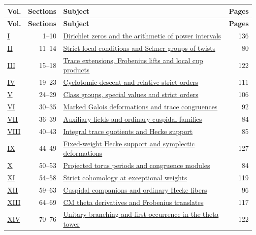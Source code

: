 \documentclass[a4paper,11pt]{article}
\theoremstyle{definition}
\theoremstyle{remark}
\numberwithin{equation}{section}
\begin{document}
\begin{longtable}{@{}l r p{.63\linewidth} r@{}}
\textbf{Vol.}&\textbf{Sections}&\textbf{Subject}&\textbf{Pages}\\[2pt]\hline\endfirsthead
\textbf{Vol.}&\textbf{Sections}&\textbf{Subject}&\textbf{Pages}\\[2pt]\hline\endhead
\hyperref[nav:volume-I]{I} & 1--10 & \hyperref[nav:volume-I]{Dirichlet zeros and the arithmetic of power intervals} & 136 \\
\hyperref[nav:volume-II]{II} & 11--14 & \hyperref[nav:volume-II]{Strict local conditions and Selmer groups of twists} & 80 \\
\hyperref[nav:volume-III]{III} & 15--18 & \hyperref[nav:volume-III]{Trace extensions, Frobenius lifts and local cup products} & 122 \\
\hyperref[nav:volume-IV]{IV} & 19--23 & \hyperref[nav:volume-IV]{Cyclotomic descent and relative strict orders} & 111 \\
\hyperref[nav:volume-V]{V} & 24--29 & \hyperref[nav:volume-V]{Class groups, special values and strict orders} & 106 \\
\hyperref[nav:volume-VI]{VI} & 30--35 & \hyperref[nav:volume-VI]{Marked Galois deformations and trace congruences} & 92 \\
\hyperref[nav:volume-VII]{VII} & 36--39 & \hyperref[nav:volume-VII]{Auxiliary fields and ordinary cuspidal families} & 84 \\
\hyperref[nav:volume-VIII]{VIII} & 40--43 & \hyperref[nav:volume-VIII]{Integral trace quotients and Hecke support} & 85 \\
\hyperref[nav:volume-IX]{IX} & 44--49 & \hyperref[nav:volume-IX]{Fixed-weight Hecke support and symplectic deformations} & 127 \\
\hyperref[nav:volume-X]{X} & 50--53 & \hyperref[nav:volume-X]{Projected torus periods and congruence modules} & 84 \\
\hyperref[nav:volume-XI]{XI} & 54--58 & \hyperref[nav:volume-XI]{Strict cohomology at exceptional weights} & 119 \\
\hyperref[nav:volume-XII]{XII} & 59--63 & \hyperref[nav:volume-XII]{Cuspidal companions and ordinary Hecke fibers} & 96 \\
\hyperref[nav:volume-XIII]{XIII} & 64--69 & \hyperref[nav:volume-XIII]{CM theta derivatives and Frobenius translates} & 117 \\
\hyperref[nav:volume-XIV]{XIV} & 70--76 & \hyperref[nav:volume-XIV]{Unitary branching and first occurrence in the theta tower} & 122 \\

\end{longtable}
\end{document}
